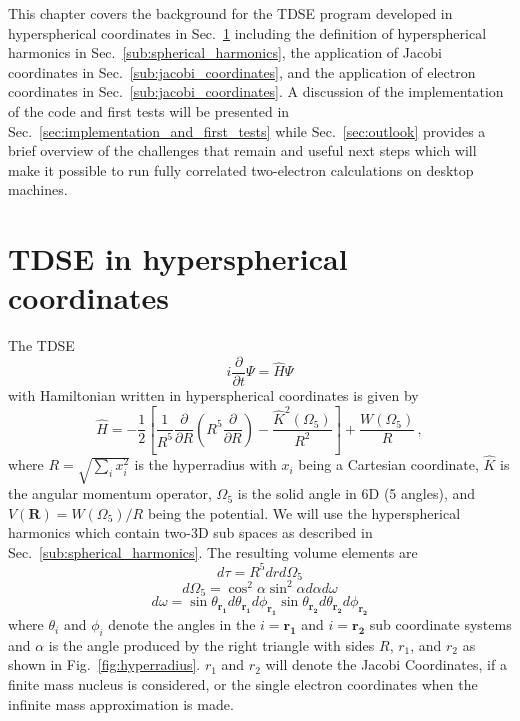 This chapter covers the background for the TDSE program developed in hyperspherical coordinates in Sec.~\ref{sec:tdse_in_hyperspherical_coordinates} including the definition of hyperspherical harmonics in Sec.~\ref{sub:spherical_harmonics}, the application of Jacobi coordinates in Sec.~\ref{sub:jacobi_coordinates}, and the application of electron coordinates in Sec.~\ref{sub:jacobi_coordinates}. A discussion of the implementation of the code and first tests will be presented in Sec.~\ref{sec:implementation_and_first_tests} while Sec.~\ref{sec:outlook} provides a brief overview of the challenges that remain and useful next steps which will make it possible to run fully correlated two-electron calculations on desktop machines.

\section{TDSE in hyperspherical coordinates} %
\label{sec:tdse_in_hyperspherical_coordinates}
The TDSE
\begin{equation}
    i\frac{\partial}{\partial t}\Psi = \hat{H}\Psi
\end{equation}
with Hamiltonian written in hyperspherical coordinates is given by
\begin{equation}
   \hat{H} = -\frac{1}{2} \left[\frac{1}{R^5}\frac{\partial}{\partial R}\left(R^5\frac{\partial}{\partial R}\right) - \frac{\hat{K}^2(\Omega_5)}{R^2}\right] + \frac{W(\Omega_5)}{R}\, ,
\end{equation}
where $R=\sqrt{\sum_i x_i^2}$ is the hyperradius with $x_i$ being a Cartesian coordinate, $\hat{K}$ is the angular momentum operator, $\Omega_5$ is the solid angle in 6D (5 angles), and $V(\mathbf{R}) = W(\Omega_5)/R$ being the potential. We will use the hyperspherical harmonics which contain two-3D sub spaces as described in Sec.~\ref{sub:spherical_harmonics}. 
The resulting volume elements are 
\begin{equation}
    d\tau = R^5 dr d\Omega_5
\end{equation}
\begin{equation}
    d\Omega_5 = \cos^2\alpha \sin^2\alpha d\alpha d\omega
\end{equation}
\begin{equation}
    d\omega = \sin\theta_\mathbf{r_1} d\theta_\mathbf{r_1} d\phi_\mathbf{r_1} \sin\theta_\mathbf{r_2} d\theta_\mathbf{r_2} d\phi_\mathbf{r_2}
\end{equation}
where $\theta_i$ and $\phi_i$ denote the angles in the $i=\mathbf{r_1}$ and $i=\mathbf{r_2}$ sub coordinate systems and $\alpha$ is the angle produced by the right triangle with sides $R$, ${r_1}$, and ${r_2}$ as shown in Fig.~\ref{fig:hyperradius}. $r_1$ and $r_2$ will denote the Jacobi Coordinates, if a finite mass nucleus is considered, or the single electron coordinates when the infinite mass approximation is made.
